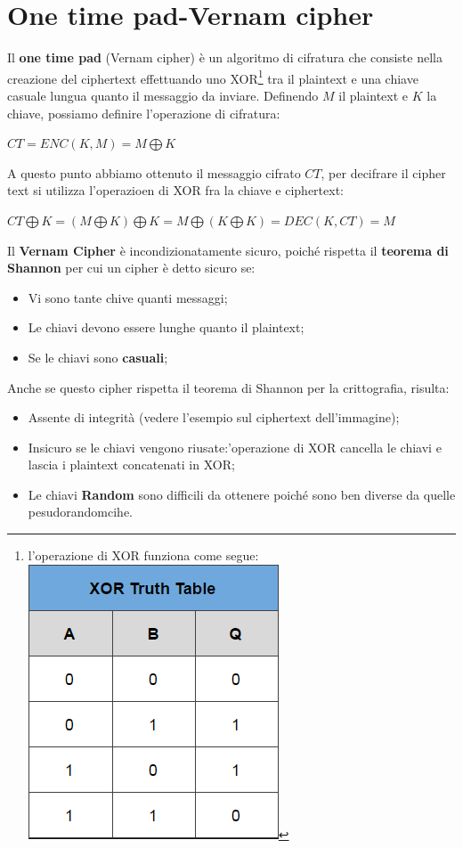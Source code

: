 \documentclass{book}
\theoremstyle{remark}
\begin{document}
\chapter{One time pad-Vernam cipher} Il \textbf{one time pad} (Vernam cipher) è un algoritmo di cifratura che consiste nella creazione del ciphertext effettuando uno XOR\footnote{l'operazione di XOR funziona come segue:\@\includegraphics[scale=0.3]{XOR}
} tra il plaintext e una chiave casuale lungua quanto il messaggio da inviare\@. Definendo \(M\) il plaintext e \(K\) la chiave, possiamo definire l'operazione di cifratura:
\begin{center}
	\(CT=ENC(K,M)=M\bigoplus K\)
\end{center}
A questo punto abbiamo ottenuto il messaggio cifrato \(CT\), per decifrare il cipher text si utilizza l'operazioen di XOR fra la chiave e ciphertext:
\begin{center}
	\(CT\bigoplus K=(M\bigoplus K)\bigoplus K=M\bigoplus (K\bigoplus K)=DEC(K,CT)=M\)
\end{center}
Il \textbf{ Vernam Cipher} è incondizionatamente sicuro, poiché rispetta il \textbf{teorema di Shannon} per cui un cipher è detto sicuro se:
\begin{itemize}
	\item Vi sono tante chive quanti messaggi;\@
	\item Le chiavi devono essere lunghe quanto il plaintext;\@
	\item Se le chiavi sono \textbf{casuali};\@
\end{itemize}
Anche se questo cipher rispetta il teorema di Shannon per la crittografia, risulta:
\begin{itemize}
	\item Assente di integrità (vedere l'esempio sul ciphertext dell'immagine);\@
	\item Insicuro se le chiavi vengono riusate:\@l'operazione di XOR cancella le chiavi e lascia i plaintext concatenati in XOR\@;\@
	\item Le chiavi \textbf{Random} sono difficili da ottenere poiché sono ben diverse da quelle pesudorandomcihe.
\end{itemize}
\end{document}
